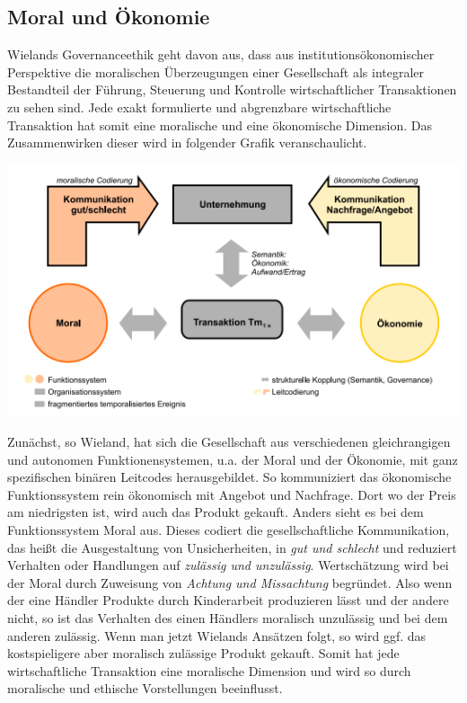 \documentclass[12pt]{article}
\begin{document}
\subsection{Moral und Ökonomie}
Wielands Governanceethik geht davon aus, dass aus institutionsökonomischer Perspektive die moralischen Überzeugungen einer Gesellschaft als integraler Bestandteil der Führung, Steuerung und Kontrolle wirtschaftlicher Transaktionen zu sehen sind. Jede exakt formulierte und abgrenzbare wirtschaftliche Transaktion hat somit eine moralische und eine ökonomische Dimension. Das Zusammenwirken dieser wird in folgender Grafik veranschaulicht.
\begin{center}
\includegraphics[width=.9\textwidth]{wieland1.png}
\end{center}
Zunächst, so Wieland, hat sich die Gesellschaft aus verschiedenen gleichrangigen und autonomen Funktionensystemen, u.a. der Moral und der Ökonomie, mit ganz spezifischen binären Leitcodes herausgebildet. So kommuniziert das ökonomische Funktionssystem rein ökonomisch mit Angebot und Nachfrage. Dort wo der Preis am niedrigsten ist, wird auch das Produkt gekauft. Anders sieht es bei dem Funktionssystem Moral aus. Dieses codiert die gesellschaftliche Kommunikation, das heißt die Ausgestaltung von Unsicherheiten, in \textit{gut und schlecht} und reduziert Verhalten oder Handlungen auf \textit{zulässig und unzulässig}. Wertschätzung wird bei der Moral durch Zuweisung von \textit{Achtung und Missachtung} begründet. Also wenn der eine Händler Produkte durch Kinderarbeit produzieren lässt und der andere nicht, so ist das Verhalten des einen Händlers moralisch unzulässig und bei dem anderen zulässig. Wenn man jetzt Wielands Ansätzen folgt, so wird ggf. das kostspieligere aber moralisch zulässige Produkt gekauft. Somit hat jede wirtschaftliche Transaktion eine moralische Dimension und wird so durch moralische und ethische Vorstellungen beeinflusst.
\end{document}
